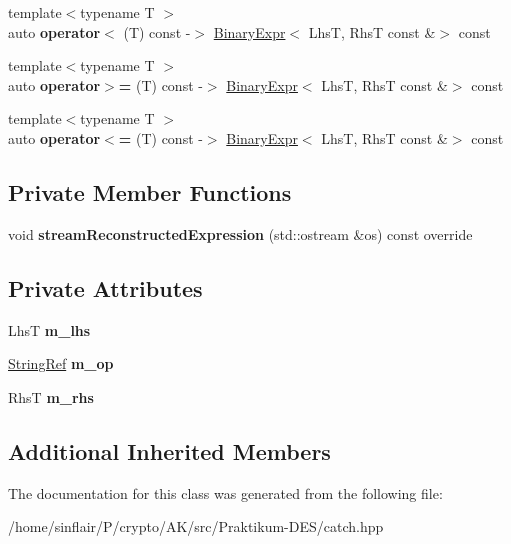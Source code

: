\begin{DoxyCompactItemize}
\item 
\mbox{\label{classCatch_1_1BinaryExpr_a8328cde75134e02d7d44c5277db96c09}} 
{\footnotesize template$<$typename T $>$ }\\auto {\bfseries operator$<$} (T) const -\/$>$ \hyperlink{classCatch_1_1BinaryExpr}{Binary\+Expr}$<$ LhsT, RhsT const \&$>$ const
\item 
\mbox{\label{classCatch_1_1BinaryExpr_a334b84ac38c19c7c961a6d974a6c7d73}} 
{\footnotesize template$<$typename T $>$ }\\auto {\bfseries operator$>$=} (T) const -\/$>$ \hyperlink{classCatch_1_1BinaryExpr}{Binary\+Expr}$<$ LhsT, RhsT const \&$>$ const
\item 
\mbox{\label{classCatch_1_1BinaryExpr_a8773a729df3a465cad4e270e912db436}} 
{\footnotesize template$<$typename T $>$ }\\auto {\bfseries operator$<$=} (T) const -\/$>$ \hyperlink{classCatch_1_1BinaryExpr}{Binary\+Expr}$<$ LhsT, RhsT const \&$>$ const
\end{DoxyCompactItemize}
\subsection*{Private Member Functions}
\begin{DoxyCompactItemize}
\item 
\mbox{\label{classCatch_1_1BinaryExpr_af998022712d4bd3e4fc7ab9b8a38b445}} 
void {\bfseries stream\+Reconstructed\+Expression} (std\+::ostream \&os) const override
\end{DoxyCompactItemize}
\subsection*{Private Attributes}
\begin{DoxyCompactItemize}
\item 
\mbox{\label{classCatch_1_1BinaryExpr_a306b29e77b48f9c538c5031a59adc4ce}} 
LhsT {\bfseries m\+\_\+lhs}
\item 
\mbox{\label{classCatch_1_1BinaryExpr_ab21dea40c53fd64d4f7a073dbe93ec95}} 
\hyperlink{classCatch_1_1StringRef}{String\+Ref} {\bfseries m\+\_\+op}
\item 
\mbox{\label{classCatch_1_1BinaryExpr_a54cb1629bf304ebe0c1560f4cc2bc186}} 
RhsT {\bfseries m\+\_\+rhs}
\end{DoxyCompactItemize}
\subsection*{Additional Inherited Members}


The documentation for this class was generated from the following file\+:\begin{DoxyCompactItemize}
\item 
/home/sinflair/\+P/crypto/\+A\+K/src/\+Praktikum-\/\+D\+E\+S/catch.\+hpp\end{DoxyCompactItemize}
